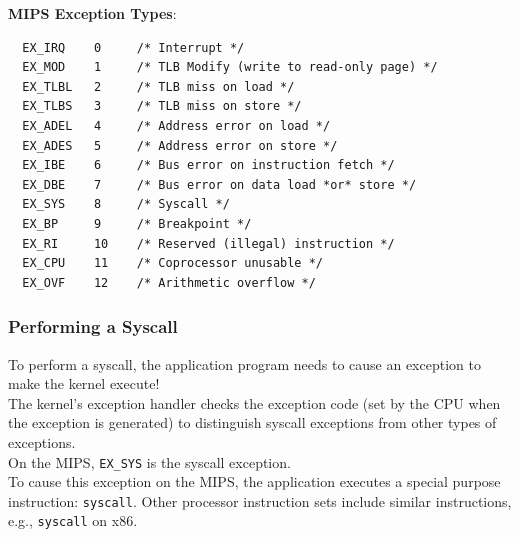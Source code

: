 \documentclass[12pt]{article}
\theoremstyle{plain}
\theoremstyle{definition}
\begin{document}
\textbf{MIPS Exception Types}:
\begin{verbatim}
  EX_IRQ    0     /* Interrupt */
  EX_MOD    1     /* TLB Modify (write to read-only page) */
  EX_TLBL   2     /* TLB miss on load */
  EX_TLBS   3     /* TLB miss on store */
  EX_ADEL   4     /* Address error on load */
  EX_ADES   5     /* Address error on store */
  EX_IBE    6     /* Bus error on instruction fetch */
  EX_DBE    7     /* Bus error on data load *or* store */
  EX_SYS    8     /* Syscall */
  EX_BP     9     /* Breakpoint */
  EX_RI     10    /* Reserved (illegal) instruction */
  EX_CPU    11    /* Coprocessor unusable */
  EX_OVF    12    /* Arithmetic overflow */
\end{verbatim}

\subsubsection{Performing a Syscall}
To perform a syscall, the application program needs to cause an exception to make the kernel execute! \\
The kernel's exception handler checks the exception code (set by the CPU when the exception is generated) to distinguish syscall exceptions from other types of exceptions. \\

On the MIPS, \texttt{EX\_SYS} is the syscall exception. \\
To cause this exception on the MIPS, the application executes a special purpose instruction: \texttt{syscall}.
Other processor instruction sets include similar instructions, e.g., \texttt{syscall} on x86.
\end{document}
